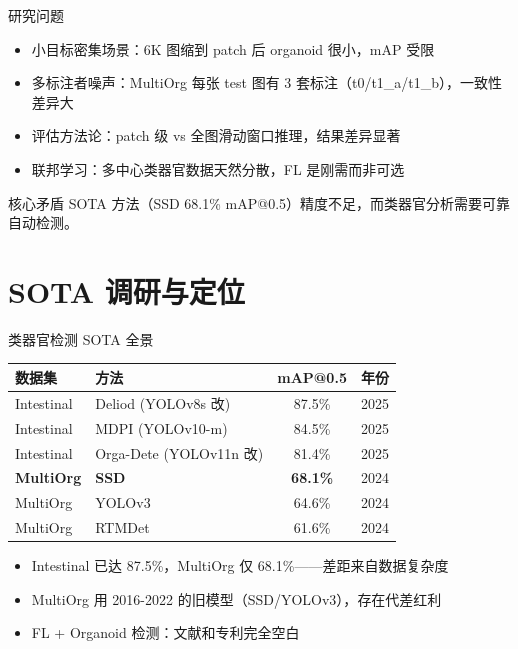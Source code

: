 \documentclass[aspectratio=169, 11pt]{beamer}
\begin{document}
\begin{frame}{研究问题}
  \begin{itemize}
    \item<1-> \alert{小目标密集场景}：6K 图缩到 patch 后 organoid 很小，mAP 受限
    \item<2-> \alert{多标注者噪声}：MultiOrg 每张 test 图有 3 套标注（t0/t1\_a/t1\_b），一致性差异大
    \item<3-> \alert{评估方法论}：patch 级 vs 全图滑动窗口推理，结果差异显著
    \item<4-> \alert{联邦学习}：多中心类器官数据天然分散，FL 是刚需而非可选
  \end{itemize}
  \vspace{0.5em}
  \begin{alertblock}{核心矛盾}
    SOTA 方法（SSD 68.1\% mAP@0.5）精度不足，而类器官分析需要可靠自动检测。
  \end{alertblock}
\end{frame}

\section{SOTA 调研与定位}

\begin{frame}{类器官检测 SOTA 全景}
  \centering
  \begin{tabular}{llcc}
    \toprule
    数据集 & 方法 & mAP@0.5 & 年份 \\
    \midrule
    Intestinal & Deliod (YOLOv8s 改) & 87.5\% & 2025 \\
    Intestinal & MDPI (YOLOv10-m) & 84.5\% & 2025 \\
    Intestinal & Orga-Dete (YOLOv11n 改) & 81.4\% & 2025 \\
    \textbf{MultiOrg} & \textbf{SSD} & \textbf{68.1\%} & 2024 \\
    MultiOrg & YOLOv3 & 64.6\% & 2024 \\
    MultiOrg & RTMDet & 61.6\% & 2024 \\
    \bottomrule
  \end{tabular}
  \vspace{0.8em}
  \begin{itemize}
    \item Intestinal 已达 87.5\%，MultiOrg 仅 68.1\%——差距来自数据复杂度
    \item MultiOrg 用 2016-2022 的旧模型（SSD/YOLOv3），\alert{存在代差红利}
    \item FL + Organoid 检测：\alert{文献和专利完全空白}
  \end{itemize}
\end{frame}
\end{document}
